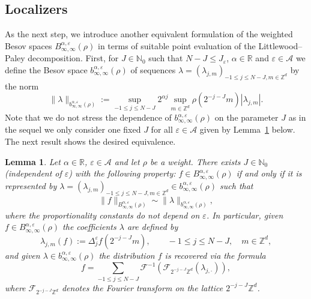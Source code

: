 \documentclass[a4paper,11pt]{article}
\newcommand{\assign}{:=}
\newtheorem{lemma}[theorem]{Lemma}
\numberwithin{equation}{section}
\begin{document}
  
  \subsection{Localizers}
  \label{s:l1}
As the next step, we introduce another equivalent formulation of the weighted
Besov spaces $B^{\alpha, \varepsilon}_{\infty, \infty} (\rho)$ in terms of
suitable point evaluation of the Littlewood--Paley decomposition. First, for
$J \in \mathbb{N}_0$ such that $N - J \leqslant J_{\varepsilon}$, $\alpha \in
\mathbb{R}$ and $\varepsilon \in \mathcal{A}$ we define the Besov space
$b^{\alpha, \varepsilon}_{\infty, \infty} (\rho)$ of sequences $\lambda =
(\lambda_{j, m})_{- 1 \leqslant j \leqslant N - J, m \in \mathbb{Z}^d}$ by the
norm
\[ \| \lambda \|_{b^{\alpha, \varepsilon}_{\infty, \infty} (\rho)} \assign
   \sup_{- 1 \leqslant j \leqslant N - J} 2^{\alpha j} \sup_{m \in
   \mathbb{Z}^d} \rho (2^{- j - J} m) | \lambda_{j, m} | . \]
Note that we do not stress the dependence of $b^{\alpha, \varepsilon}_{\infty,
\infty} (\rho)$ on the parameter $J$ as in the sequel we only consider one
fixed $J$ for all $\varepsilon \in \mathcal{A}$ given by Lemma~\ref{lem:equiv}
below.
The next result shows  the desired equivalence.

\begin{lemma}
  \label{lem:equiv}Let $\alpha \in \mathbb{R}$, $\varepsilon \in \mathcal{A}$
  and let $\rho$ be a weight. There exists $J \in \mathbb{N}_0$ (independent
  of $\varepsilon$) with the following property: $f \in B^{\alpha,
  \varepsilon}_{\infty, \infty} (\rho)$ if and only if it is represented by
  $\lambda = (\lambda_{j, m})_{- 1 \leqslant j \leqslant N - J, m \in
  \mathbb{Z}^d} \in b^{\alpha, \varepsilon}_{\infty, \infty} (\rho)$ such that
  \begin{equation}
    \| f \|_{B_{\infty, \infty}^{\alpha, \varepsilon} (\rho)} \sim \| \lambda
    \|_{b^{\alpha, \varepsilon}_{\infty, \infty} (\rho)}, \label{eq:d3}
  \end{equation}
  where the proportionality constants do not depend on $\varepsilon$. In
  particular, given $f \in B^{\alpha, \varepsilon}_{\infty, \infty} (\rho)$
  the coefficients $\lambda$ are defined by
  \begin{equation}
    \lambda_{j, m} (f) \assign \Delta_j^{\varepsilon} f (2^{- j - J} m),
    \qquad - 1 \leqslant j \leqslant N - J, \hspace{1em} m \in \mathbb{Z}^d,
    \label{eq:d1}
  \end{equation}
  and given $\lambda \in b^{\alpha, \varepsilon}_{\infty, \infty} (\rho)$ the
  distribution $f$ is recovered via the formula
  \begin{equation}
    f = \sum_{- 1 \leqslant j \leqslant N - J} 
    \mathcal{F}^{- 1} (\mathcal{F}_{2^{- j - J} \mathbb{Z}^d} (\lambda_{j,
    \cdot})), \label{eq:d2}
  \end{equation}
  where $\mathcal{F}_{2^{- j - J} \mathbb{Z}^d}$ denotes the Fourier transform
  on the lattice $2^{- j - J} \mathbb{Z}^d$.
\end{lemma}
\end{document}
